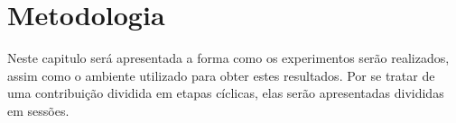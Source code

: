 \chapter{Metodologia}

Neste capitulo será apresentada a forma como os experimentos serão realizados, assim como o ambiente  utilizado para obter estes resultados. Por se tratar de uma contribuição dividida em etapas cíclicas, elas serão apresentadas divididas em sessões.

